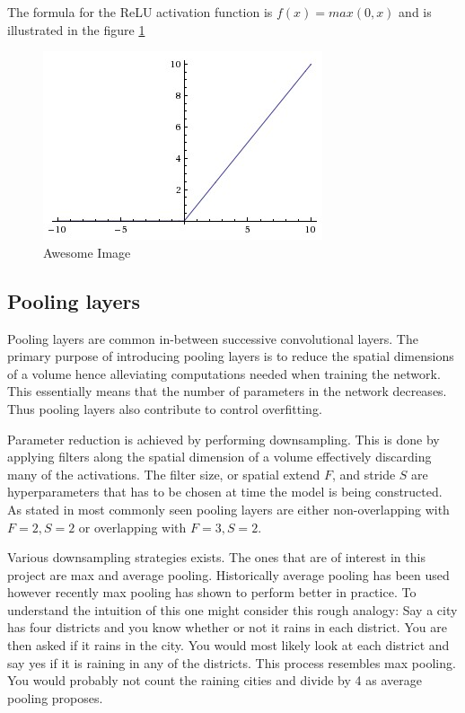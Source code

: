 The formula for the ReLU activation function is $f(x)=max(0,x)$ and is illustrated in the figure \ref{fig:relu}

\begin{figure}
  \centering
  \includegraphics[scale=0.5]{Img/relu.jpeg}
  \caption{Awesome Image}
  \label{fig:relu}
\end{figure}


\subsection{Pooling layers} %
\label{sub:pool_layers}

Pooling layers are common in-between successive convolutional layers. The primary purpose of introducing pooling layers is to reduce the spatial dimensions of a volume hence alleviating computations needed when training the network. This essentially means that the number of parameters in the network decreases. Thus pooling layers also contribute to control overfitting.

Parameter reduction is achieved by performing downsampling. This is done by applying filters along the spatial dimension of a volume effectively discarding many of the activations. The filter size, or spatial extend $F$, and stride $S$ are hyperparameters that has to be chosen at time the model is being constructed. As stated in \cite{cs231n} most commonly seen pooling layers are either non-overlapping with $F=2, S=2$ or overlapping with $F=3, S=2$.

Various downsampling strategies exists. The ones that are of interest in this project are max and average pooling. Historically average pooling has been used however recently max pooling has shown to perform better in practice. To understand the intuition of this one might consider this rough analogy: Say a city has four districts and you know whether or not it rains in each district. You are then asked if it rains in the city. You would most likely look at each district and say yes if it is raining in any of the districts. This process resembles max pooling. You would probably not count the raining cities and divide by 4 as average pooling proposes. 

